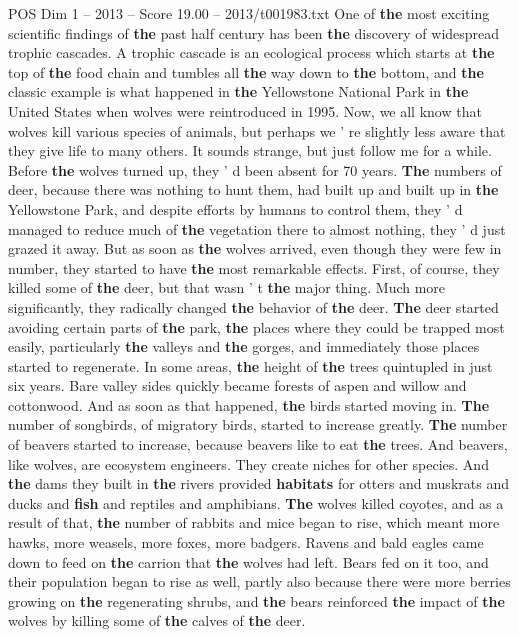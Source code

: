 \begin{textsample}{POS Dim 1 – 2013 – Score 19.00 – 2013/t001983.txt}
One of \textbf{the} most exciting scientific findings of \textbf{the} past half century has been \textbf{the} discovery of widespread trophic cascades.
A trophic cascade is an ecological process which starts at \textbf{the} top of \textbf{the} food chain and tumbles all \textbf{the} way down to \textbf{the} bottom, and \textbf{the} classic example is what happened in \textbf{the} Yellowstone National Park in \textbf{the} United States when wolves were reintroduced in 1995.
Now, we all know that wolves kill various species of animals, but perhaps we ' re slightly less aware that they give life to many others.
It sounds strange, but just follow me for a while.
Before \textbf{the} wolves turned up, they ' d been absent for 70 years. \textbf{The} numbers of deer, because there was nothing to hunt them, had built up and built up in \textbf{the} Yellowstone Park, and despite efforts by humans to control them, they ' d managed to reduce much of \textbf{the} vegetation there to almost nothing, they ' d just grazed it away.
But as soon as \textbf{the} wolves arrived, even though they were few in number, they started to have \textbf{the} most remarkable effects.
First, of course, they killed some of \textbf{the} deer, but that wasn ' t \textbf{the} major thing.
Much more significantly, they radically changed \textbf{the} behavior of \textbf{the} deer. \textbf{The} deer started avoiding certain parts of \textbf{the} park, \textbf{the} places where they could be trapped most easily, particularly \textbf{the} valleys and \textbf{the} gorges, and immediately those places started to regenerate.
In some areas, \textbf{the} height of \textbf{the} trees quintupled in just six years.
Bare valley sides quickly became forests of aspen and willow and cottonwood.
And as soon as that happened, \textbf{the} birds started moving in. \textbf{The} number of songbirds, of migratory birds, started to increase greatly. \textbf{The} number of beavers started to increase, because beavers like to eat \textbf{the} trees.
And beavers, like wolves, are ecosystem engineers.
They create niches for other species.
And \textbf{the} dams they built in \textbf{the} rivers provided \textbf{habitats} for otters and muskrats and ducks and \textbf{fish} and reptiles and amphibians. \textbf{The} wolves killed coyotes, and as a result of that, \textbf{the} number of rabbits and mice began to rise, which meant more hawks, more weasels, more foxes, more badgers.
Ravens and bald eagles came down to feed on \textbf{the} carrion that \textbf{the} wolves had left.
Bears fed on it too, and their population began to rise as well, partly also because there were more berries growing on \textbf{the} regenerating shrubs, and \textbf{the} bears reinforced \textbf{the} impact of \textbf{the} wolves by killing some of \textbf{the} calves of \textbf{the} deer.

\end{textsample}
